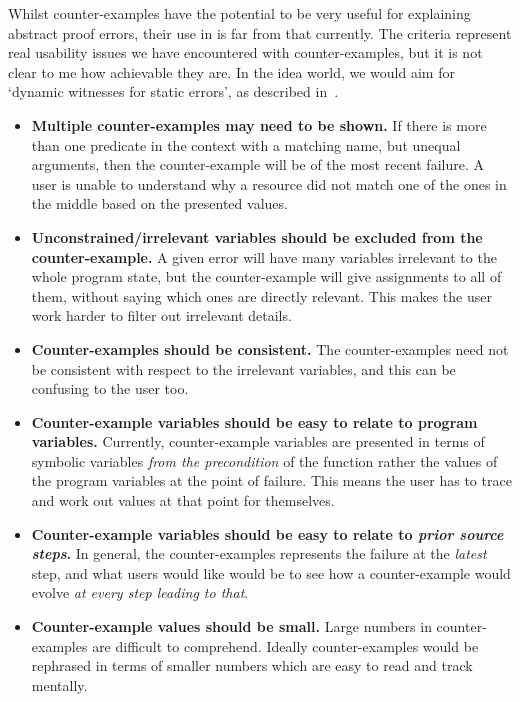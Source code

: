 Whilst counter-examples have the potential to be very useful for explaining
abstract proof errors, their use in  is far from that currently.
The criteria represent real usability issues we have encountered with
counter-examples, but it is not clear to me how achievable they are.
In the idea world, we would aim for `dynamic witnesses for static errors',
as described in~.
\begin{itemize}
    \item \textbf{Multiple counter-examples may need to be shown.}
        If there is more than one predicate in the context with a matching
        name, but unequal arguments, then the counter-example will be of
        the most recent failure. A user is unable to understand why a resource
        did not match one of the ones in the middle based on the presented
        values.
    \item \textbf{Unconstrained/irrelevant variables should be excluded from the
        counter-example.} A given error will have many variables irrelevant
        to the whole program state, but the counter-example will give
        assignments to all of them, without saying which ones are directly
        relevant. This makes the user work harder to filter out irrelevant details.
    \item \textbf{Counter-examples should be consistent.} The counter-examples
        need not be consistent with respect to the irrelevant variables, and this
        can be confusing to the user too.
    \item \textbf{Counter-example variables should be easy to relate to
        program variables.} Currently, counter-example variables are presented
        in terms of symbolic variables \emph{from the precondition} of the
        function rather the values of the program variables at the point
        of failure. This means the user has to trace and work out values
        at that point for themselves.
    \item \textbf{Counter-example variables should be easy to relate to
        \emph{prior source steps}.} In general, the counter-examples represents
        the failure at the \emph{latest} step, and what users would like would
        be to see how a counter-example would evolve \emph{at every step
        leading to that}.
    \item \textbf{Counter-example values should be small.} Large numbers in
        counter-examples are difficult to comprehend. Ideally counter-examples
        would be rephrased in terms of smaller numbers which are easy to read
        and track mentally.
\end{itemize}

